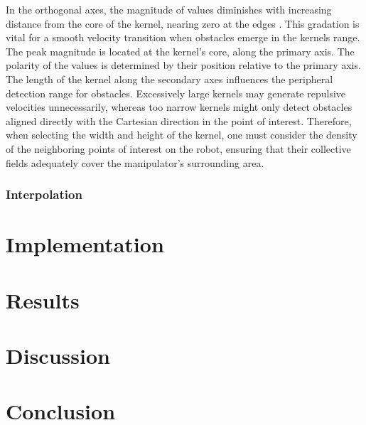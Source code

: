\documentclass[]{article}
\begin{document}
In the orthogonal axes, the magnitude of values diminishes with increasing distance from the core of the kernel, nearing zero at the edges . This gradation is vital for a smooth velocity transition when obstacles emerge in the kernels range. The peak magnitude is located at the kernel's core, along the primary axis. The polarity of the values is determined by their position relative to the primary axis. The length of the kernel along the secondary axes influences the peripheral detection range for obstacles. Excessively large kernels may generate repulsive velocities unnecessarily, whereas too narrow kernels might only detect obstacles aligned directly with the Cartesian direction in the point of interest. Therefore, when selecting the width and height of the kernel, one must consider the density of the neighboring points of interest on the robot, ensuring that their collective fields adequately cover the manipulator's surrounding area.



\subsubsection{Interpolation}



\section{Implementation}

\section{Results}



\section{Discussion}



\section{Conclusion}
\end{document}
